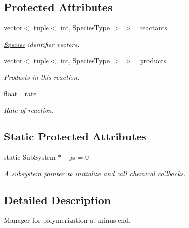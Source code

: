 \subsection*{Protected Attributes}
\begin{DoxyCompactItemize}
\item 
vector$<$ tuple$<$ int, \hyperlink{Species_8h_a50651af47c56ea0e27235468d23542cf}{Species\+Type} $>$ $>$ \hyperlink{classInternalFilamentRxnManager_a63de9061c3da4ad03cf4c530d2774979}{\+\_\+reactants}
\begin{DoxyCompactList}\small\item\em \hyperlink{classSpecies}{Species} identifier vectors. \end{DoxyCompactList}\item 
vector$<$ tuple$<$ int, \hyperlink{Species_8h_a50651af47c56ea0e27235468d23542cf}{Species\+Type} $>$ $>$ \hyperlink{classInternalFilamentRxnManager_afd213da1a3706e2e88962e5da886a5dc}{\+\_\+products}
\begin{DoxyCompactList}\small\item\em Products in this reaction. \end{DoxyCompactList}\item 
float \hyperlink{classInternalFilamentRxnManager_a8b98dd9e6f5d016149f5434b891806df}{\+\_\+rate}
\begin{DoxyCompactList}\small\item\em Rate of reaction. \end{DoxyCompactList}\end{DoxyCompactItemize}
\subsection*{Static Protected Attributes}
\begin{DoxyCompactItemize}
\item 
static \hyperlink{classSubSystem}{Sub\+System} $\ast$ \hyperlink{classInternalFilamentRxnManager_a973ce9cc2aae811e6867afa46193c5f2}{\+\_\+ps} = 0
\begin{DoxyCompactList}\small\item\em A subsystem pointer to initialize and call chemical callbacks. \end{DoxyCompactList}\end{DoxyCompactItemize}


\subsection{Detailed Description}
Manager for polymerization at minus end. 

